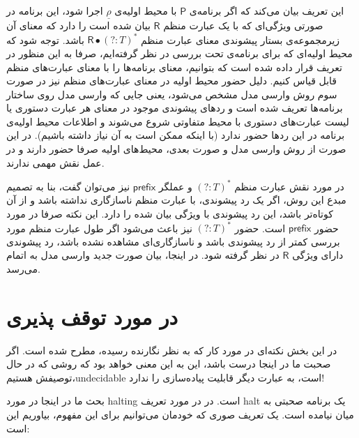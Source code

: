 این تعریف بیان می‌کند که اگر برنامه‌ی 
$\mathsf{P}$
با محیط اولیه‌ی 
$\underline{\rho}$
اجرا شود، این برنامه در صورتی ویژگی‌ای که با یک عبارت منظم 
$\mathsf{R}$
بیان شده است را دارد که معنای آن زیرمجموعه‌ی بستار پیشوندی معنای عبارت منظم
$\mathsf{R} \bullet (?:\mathit{T})^*$
باشد.
توجه شود که محیط اولیه‌ای که برای برنامه‌ی تحت بررسی در نظر گرفته‌ایم، صرفا به این منظور در تعریف قرار داده شده است که بتوانیم،  معنای برنامه‌ها را با معنای عبارت‌های منظم قابل قیاس کنیم. دلیل حضور محیط اولیه در معنای عبارت‌های منظم نیز در صورت سوم روش وارسی مدل مشخص می‌شود، یعنی جایی که وارسی مدل روی ساختار برنامه‌ها تعریف شده است و ردهای پیشوندی موجود در معنای هر عبارت دستوری یا لیست عبارت‌های دستوری با محیط متفاوتی شروع می‌شوند و اطلاعات محیط اولیه‌ی برنامه در این ردها حضور ندارد (با اینکه ممکن است به آن نیاز داشته باشیم). در این صورت از روش وارسی مدل و صورت بعدی، محیط‌های اولیه صرفا حضور دارند و در عمل نقش مهمی ندارند. 

در مورد نقش عبارت منظم
$ (?:\mathit{T})^*$
و عملگر
$ \mathsf{prefix} $
نیز می‌توان گفت، بنا به تصمیم مبدع این روش، اگر یک رد پیشوندی، با عبارت منظم ناسازگاری نداشته باشد و از آن کوتاه‌تر باشد، این رد پیشوندی با ویژگی بیان شده را دارد. این نکته صرفا در مورد حضور 
$\mathsf{prefix}$ 
است. حضور 
$(?:\mathit{T})^*$
نیز باعث می‌شود اگر طول عبارت منظم مورد بررسی کمتر از رد پیشوندی باشد و ناسازگاری‌ای مشاهده نشده باشد، رد پیشوندی دارای ویژگی $\mathsf{R}$ در نظر گرفته شود.
در اینجا، بیان صورت جدید وارسی مدل به اتمام می‌رسد.
\section{در مورد توقف پذیری}

در این بخش نکته‌ای در مورد کار که به نظر نگارنده رسیده، مطرح شده است. اگر صحبت ما در اینجا درست باشد، این به این معنی خواهد بود که روشی که در حال توصیفش هستیم،\gls*{undecidable} است، به عبارت دیگر قابلیت پیاده‌سازی را ندارد!

بحث ما در اینجا در مورد \gls*{halting} است. در \cite{calcul} در مورد تعریف \gls*{halt} یک برنامه صحبتی به میان نیامده است. یک تعریف  صوری که خودمان می‌توانیم برای این مفهوم، بیاوریم این است:

